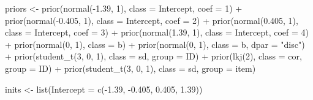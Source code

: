 \documentclass[
  man,floatsintext]{apa7}
\newenvironment{Shaded}{\begin{snugshade}}{\end{snugshade}}
\newcommand{\AttributeTok}[1]{\textcolor[rgb]{0.77,0.63,0.00}{#1}}
\newcommand{\DecValTok}[1]{\textcolor[rgb]{0.00,0.00,0.81}{#1}}
\newcommand{\FloatTok}[1]{\textcolor[rgb]{0.00,0.00,0.81}{#1}}
\newcommand{\FunctionTok}[1]{\textcolor[rgb]{0.00,0.00,0.00}{#1}}
\newcommand{\NormalTok}[1]{#1}
\newcommand{\OtherTok}[1]{\textcolor[rgb]{0.56,0.35,0.01}{#1}}
\newcommand{\SpecialCharTok}[1]{\textcolor[rgb]{0.00,0.00,0.00}{#1}}
\newcommand{\StringTok}[1]{\textcolor[rgb]{0.31,0.60,0.02}{#1}}
\begin{document}
\begin{Shaded}
\begin{Highlighting}[]
\NormalTok{priors }\OtherTok{\textless{}{-}} \FunctionTok{prior}\NormalTok{(}\FunctionTok{normal}\NormalTok{(}\SpecialCharTok{{-}}\FloatTok{1.39}\NormalTok{, }\DecValTok{1}\NormalTok{), }\AttributeTok{class =}\NormalTok{ Intercept, }\AttributeTok{coef =} \DecValTok{1}\NormalTok{) }\SpecialCharTok{+}
  \FunctionTok{prior}\NormalTok{(}\FunctionTok{normal}\NormalTok{(}\SpecialCharTok{{-}}\FloatTok{0.405}\NormalTok{, }\DecValTok{1}\NormalTok{), }\AttributeTok{class =}\NormalTok{ Intercept, }\AttributeTok{coef =} \DecValTok{2}\NormalTok{) }\SpecialCharTok{+}
  \FunctionTok{prior}\NormalTok{(}\FunctionTok{normal}\NormalTok{(}\FloatTok{0.405}\NormalTok{, }\DecValTok{1}\NormalTok{), }\AttributeTok{class =}\NormalTok{ Intercept, }\AttributeTok{coef =} \DecValTok{3}\NormalTok{) }\SpecialCharTok{+}
  \FunctionTok{prior}\NormalTok{(}\FunctionTok{normal}\NormalTok{(}\FloatTok{1.39}\NormalTok{, }\DecValTok{1}\NormalTok{), }\AttributeTok{class =}\NormalTok{ Intercept, }\AttributeTok{coef =} \DecValTok{4}\NormalTok{) }\SpecialCharTok{+}
  \FunctionTok{prior}\NormalTok{(}\FunctionTok{normal}\NormalTok{(}\DecValTok{0}\NormalTok{, }\DecValTok{1}\NormalTok{), }\AttributeTok{class =}\NormalTok{ b) }\SpecialCharTok{+}
  \FunctionTok{prior}\NormalTok{(}\FunctionTok{normal}\NormalTok{(}\DecValTok{0}\NormalTok{, }\DecValTok{1}\NormalTok{), }\AttributeTok{class =}\NormalTok{ b, }\AttributeTok{dpar =} \StringTok{"disc"}\NormalTok{) }\SpecialCharTok{+}
  \FunctionTok{prior}\NormalTok{(}\FunctionTok{student\_t}\NormalTok{(}\DecValTok{3}\NormalTok{, }\DecValTok{0}\NormalTok{, }\DecValTok{1}\NormalTok{), }\AttributeTok{class =}\NormalTok{ sd, }\AttributeTok{group =}\NormalTok{ ID) }\SpecialCharTok{+}
  \FunctionTok{prior}\NormalTok{(}\FunctionTok{lkj}\NormalTok{(}\DecValTok{2}\NormalTok{), }\AttributeTok{class =}\NormalTok{ cor, }\AttributeTok{group =}\NormalTok{ ID) }\SpecialCharTok{+}
  \FunctionTok{prior}\NormalTok{(}\FunctionTok{student\_t}\NormalTok{(}\DecValTok{3}\NormalTok{, }\DecValTok{0}\NormalTok{, }\DecValTok{1}\NormalTok{), }\AttributeTok{class =}\NormalTok{ sd, }\AttributeTok{group =}\NormalTok{ item)}

\NormalTok{inits }\OtherTok{\textless{}{-}} \FunctionTok{list}\NormalTok{(}\AttributeTok{Intercept =} \FunctionTok{c}\NormalTok{(}\SpecialCharTok{{-}}\FloatTok{1.39}\NormalTok{, }\SpecialCharTok{{-}}\FloatTok{0.405}\NormalTok{, }\FloatTok{0.405}\NormalTok{, }\FloatTok{1.39}\NormalTok{))}


\end{Highlighting}
\end{Shaded}
\end{document}
